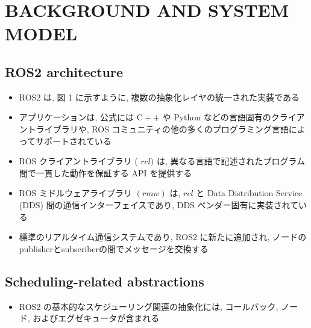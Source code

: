 
\section{BACKGROUND AND SYSTEM MODEL}
\label{sec: background_and_system_model}


\subsection{ROS2 architecture}
\label{ssec: ros2 architecture}

\begin{frame}{}
    \begin{itemize}
        \item ROS2 は, 図 1 に示すように, 複数の抽象化レイヤの統一された実装である
\item アプリケーションは, 公式には $\mathrm{C}++$ や Python などの言語固有のクライアントライブラリや, ROS コミュニティの他の多くのプログラミング言語によってサポートされている
\item ROS クライアントライブラリ ( $r c l)$ は, 異なる言語で記述されたプログラム間で一貫した動作を保証する API を提供する
\item ROS ミドルウェアライブラリ $(r m w)$ は, $r c l$ と Data Distribution Service (DDS) 間の通信インターフェイスであり, DDS ベンダー固有に実装されている
\item 標準のリアルタイム通信システムであり, ROS2 に新たに追加され, ノードのpublisherとsubscriberの間でメッセージを交換する
    \end{itemize}
\end{frame}

\subsection{Scheduling-related abstractions}
\label{ssec: scheduling-related abstractions}

\begin{frame}{}
    \begin{itemize}
        \item ROS2 の基本的なスケジューリング関連の抽象化には, コールバック, ノード, およびエグゼキュータが含まれる
    \end{itemize}
\end{frame}

